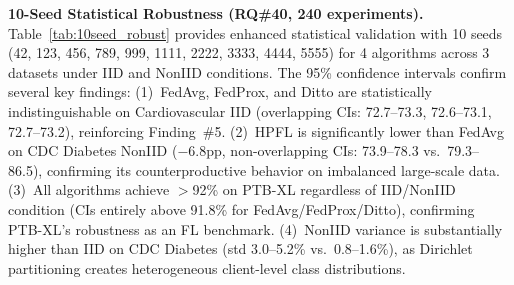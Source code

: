 \documentclass[conference,a4paper]{IEEEtran}
\begin{document}
\smallskip\noindent\textbf{10-Seed Statistical Robustness (RQ\#40, 240 experiments).}
Table~\ref{tab:10seed_robust} provides enhanced statistical validation with 10 seeds (42, 123, 456, 789, 999, 1111, 2222, 3333, 4444, 5555) for 4 algorithms across 3 datasets under IID and NonIID conditions. The 95\% confidence intervals confirm several key findings: (1)~FedAvg, FedProx, and Ditto are statistically indistinguishable on Cardiovascular IID (overlapping CIs: 72.7--73.3, 72.6--73.1, 72.7--73.2), reinforcing Finding~\#5. (2)~HPFL is significantly lower than FedAvg on CDC Diabetes NonIID ($-$6.8pp, non-overlapping CIs: 73.9--78.3 vs.\ 79.3--86.5), confirming its counterproductive behavior on imbalanced large-scale data. (3)~All algorithms achieve $>$92\% on PTB-XL regardless of IID/NonIID condition (CIs entirely above 91.8\% for FedAvg/FedProx/Ditto), confirming PTB-XL's robustness as an FL benchmark. (4)~NonIID variance is substantially higher than IID on CDC Diabetes (std 3.0--5.2\% vs.\ 0.8--1.6\%), as Dirichlet partitioning creates heterogeneous client-level class distributions.
\end{document}
